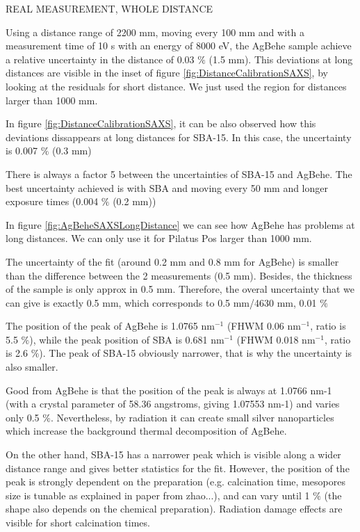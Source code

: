 REAL MEASUREMENT, WHOLE DISTANCE

Using a distance range of 2200 mm, moving every 100 mm and with a measurement time of 10 s with an energy of 8000 eV, the AgBehe sample achieve a relative uncertainty in the distance of 0.03 $\%$ (1.5 mm). This deviations at long distances are visible in the inset of figure \ref{fig:DistanceCalibrationSAXS}, by looking at the residuals for short distance. We just used the region for distances larger than 1000 mm.

In figure \ref{fig:DistanceCalibrationSAXS}, it can be also observed how this deviations dissappears at long distances for SBA-15. In this case, the uncertainty is 0.007 $\%$ (0.3 mm)

There is always a factor 5 between the uncertainties of SBA-15 and AgBehe. The best uncertainty achieved is with SBA and moving every 50 mm and longer exposure times (0.004 $\%$ (0.2 mm))

In figure \ref{fig:AgBeheSAXSLongDistance} we can see how AgBehe has problems at long distances. We can only use it for Pilatus Pos larger than 1000 mm.




The uncertainty of the fit (around 0.2 mm and 0.8 mm for AgBehe) is smaller than the difference between the 2 measurements (0.5 mm). Besides, the thickness of the sample is only approx in 0.5 mm. Therefore, the overal uncertainty that we can give is exactly 0.5 mm, which corresponds to 0.5 mm/4630 mm, 0.01 $\%$

The position of the peak of AgBehe is 1.0765 nm$^{-1}$ (FHWM 0.06 nm$^{-1}$, ratio is 5.5 $\%$), while the peak position of SBA is 0.681 nm$^{-1}$ (FHWM 0.018 nm$^{-1}$, ratio is 2.6 $\%$). The peak of SBA-15 obviously narrower, that is why the uncertainty is also smaller.

Good from AgBehe is that the position of the peak is always at 1.0766 nm-1 \cite{blanton_jcpdsinternational_1995} (with a crystal parameter of 58.36 angstroms, giving 1.07553 nm-1)  and varies only 0.5 $\%$. Nevertheless, by radiation it can create small silver nanoparticles which increase the background \cite{liu_thermal_2006} thermal decomposition of AgBehe.

On the other hand, SBA-15 has a narrower peak which is visible along a wider distance range and gives better statistics for the fit. However, the position of the peak is strongly dependent on the preparation (e.g. calcination time, mesopores size is tunable as explained in paper from zhao...), and can vary until 1 $\%$ (the shape also depends on the chemical preparation). Radiation damage effects are visible for short calcination times.



